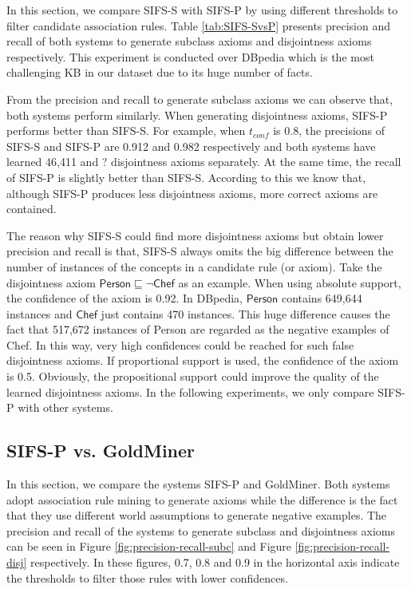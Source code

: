 In this section, we compare SIFS-S with SIFS-P by using different thresholds to filter candidate association rules. Table \ref{tab:SIFS-SvsP} presents precision and recall of both systems to generate subclass axioms and disjointness axioms respectively. This experiment is conducted over DBpedia which is the most challenging KB in our dataset due to its huge number of facts.

From the precision and recall to generate subclass axioms we can observe that, both systems perform similarly. When generating disjointness axioms, SIFS-P performs better than SIFS-S. For example, when $t_{conf}$ is 0.8, the precisions of SIFS-S and SIFS-P are 0.912 and 0.982 respectively and both systems have learned 46,411 and ? disjointness axioms separately. At the same time, the recall of SIFS-P is slightly better than SIFS-S. According to this we know that, although SIFS-P produces less disjointness axioms, more correct axioms are contained.

The reason why SIFS-S could find more disjointness axioms but obtain lower precision and recall is that, SIFS-S always omits the big difference between the number of instances of the concepts in a candidate rule (or axiom). Take the disjointness axiom $\textsf{Person} \sqsubseteq \neg \textsf{Chef}$ as an example.
%
When using absolute support, the confidence of the axiom is 0.92. In DBpedia, $\textsf{Person}$ contains 649,644 instances and $\textsf{Chef}$ just contains 470 instances. This huge difference causes the fact that 517,672 instances of \textsf{Person} are regarded as the negative examples of \textsf{Chef}. In this way, very high confidences could be reached for such false disjointness axioms. If proportional support is used, the confidence of the axiom is 0.5. Obviously, the propositional support could improve the quality of the learned disjointness axioms. In the following experiments, we only compare SIFS-P with other systems.

\subsection{SIFS-P vs. GoldMiner}
In this section, we compare the systems SIFS-P and GoldMiner. Both systems adopt association rule mining to generate axioms while the difference is the fact that they use different world assumptions to generate negative examples. The precision and recall of the systems to generate subclass and disjointness axioms can be seen in Figure  \ref{fig:precision-recall-subc} and Figure \ref{fig:precision-recall-disj} respectively. In these figures, 0.7, 0.8 and 0.9 in the horizontal axis indicate the thresholds to filter those rules with lower confidences.

